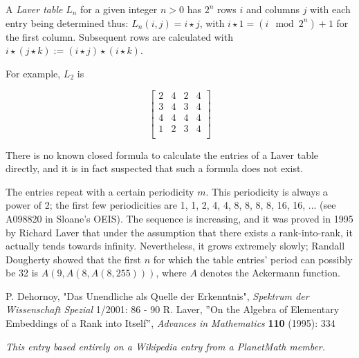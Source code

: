 \documentclass[12pt]{article}
\begin{document}
A {\em Laver table} $L_n$ for a given integer $n > 0$ has $2^n$ rows $i$ and columns $j$ with each entry being determined thus: $L_n(i, j) = i \star j$, with $i \star 1 = (i \mod 2^n) + 1$ for the first column. Subsequent rows are calculated with $i \star (j \star k) := (i \star j) \star (i \star k)$.

For example, $L_2$ is

$$\begin{bmatrix}
2 & 4 & 2 & 4 \\
3 & 4 & 3 & 4 \\
4 & 4 & 4 & 4 \\
1 & 2 & 3 & 4 \\
\end{bmatrix}$$

There is no known closed formula to calculate the entries of a Laver table directly, and it is in fact suspected that such a formula does not exist.

The entries repeat with a certain periodicity $m$. This periodicity is always a power of 2; the first few periodicities are 1, 1, 2, 4, 4, 8, 8, 8, 8, 16, 16, ... (see A098820 in Sloane's OEIS). The sequence is increasing, and it was proved in 1995 by Richard Laver that under the assumption that there exists a rank-into-rank, it actually tends towards infinity. Nevertheless, it grows extremely slowly; Randall Dougherty showed that the first $n$ for which the table entries' period can possibly be 32 is $A(9,A(8,A(8,255)))$, where $A$ denotes the Ackermann function.

\begin{thebibliography}{9}
 P. Dehornoy, "Das Unendliche als Quelle der Erkenntnis", {\it Spektrum der Wissenschaft Spezial} 1/2001: 86 - 90
 R. Laver, ''On the Algebra of Elementary Embeddings of a Rank into Itself'', {\it Advances in Mathematics} {\bf 110} (1995): 334
\end{thebibliography}

{\it This entry based entirely on a Wikipedia entry from a PlanetMath member.}
\end{document}
